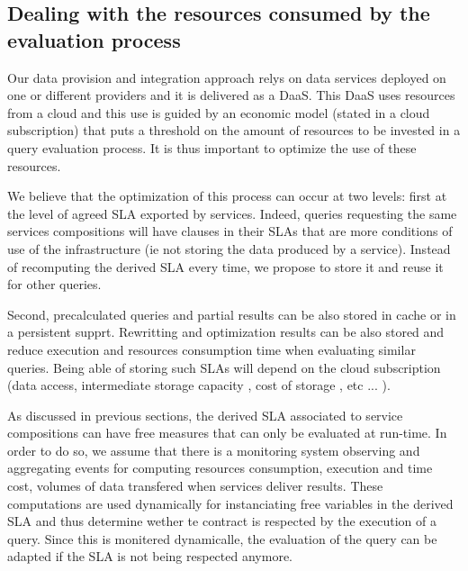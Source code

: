  
\subsection{Dealing with the resources consumed by the evaluation process}
\label{sec:queryProcessOpt}
  
 
 Our data provision and integration approach relys on data services deployed on one or different providers and it is delivered as a DaaS. This DaaS  uses resources from a cloud and this use  is  guided by an economic model (stated in a cloud subscription) that puts a threshold on the amount of resources to be invested in a query evaluation process. It is thus important to optimize the use of these resources.
 
 We believe that the optimization of this process can occur at two levels: first at the level of agreed SLA exported by services.  Indeed, queries requesting the same services compositions will have clauses in their SLAs that are more conditions of use of the infrastructure (ie not storing the data produced by a service). Instead of recomputing the derived SLA every time, we propose to store it and reuse it for other queries. 
 
Second, precalculated queries and partial results can be also stored in cache or in a persistent supprt. Rewritting and optimization results can be also stored and reduce execution and resources consumption time when evaluating similar queries. Being able of storing such SLAs will depend on the cloud subscription (data access, intermediate storage capacity , cost of storage , etc ... ).

As discussed in previous sections, the derived SLA associated to service compositions can have free measures that can only be evaluated at run-time. In order to do so, we assume that there is a monitoring system observing and aggregating events for computing resources consumption, execution and time cost, volumes of data transfered when services deliver results. These computations are used dynamically for instanciating free variables in the derived SLA and thus determine wether te contract is respected by the execution of a query. Since this is monitered dynamicalle, the evaluation of the query can be adapted if the SLA is not being respected anymore.


